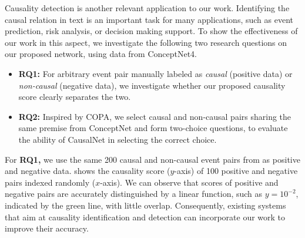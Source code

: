 Causality detection is another relevant application to our
work. Identifying the causal relation in text is an important task
for many applications, such as event prediction, risk analysis, or
decision making support\cite{mirza2014extracting}. To show the
effectiveness of our work in this aspect, we investigate the
following two research questions on our proposed network, using data
from ConceptNet4.
\begin{itemize}
\item {\bf RQ1:}
For arbitrary event pair manually labeled as \emph{causal} (positive data)
or \emph{non-causal} (negative data), we investigate whether our
proposed causality score clearly separates the two.
\item {\bf RQ2:} Inspired by COPA, we select causal and non-causal pairs
sharing the same premise from ConceptNet and form two-choice
questions, to evaluate the ability of CausalNet in selecting the
correct choice.
\end{itemize}




For {\bf RQ1,}
we use the same 200 causal and non-causal event pairs from
 as positive and negative data.
 shows the causality score ($y$-axis) of 100 positive
and negative pairs indexed randomly ($x$-axis). We can observe that scores
of positive and negative pairs are accurately distinguished by a
linear function, such as $y=10^{-2}$, indicated by the green line,
with little overlap. Consequently, existing systems that aim at
causality identification and detection can incorporate
our work to improve their accuracy.

